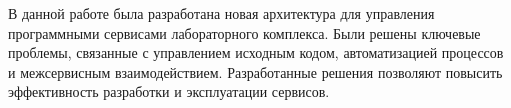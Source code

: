 \documentclass[../thesis.tex]{subfiles}
\begin{document}
	В данной работе была разработана новая архитектура для управления программными сервисами лабораторного
	комплекса. Были решены ключевые проблемы, связанные с управлением исходным кодом, автоматизацией
	процессов и межсервисным взаимодействием. Разработанные решения позволяют повысить эффективность разработки
	и эксплуатации сервисов.
\end{document}
